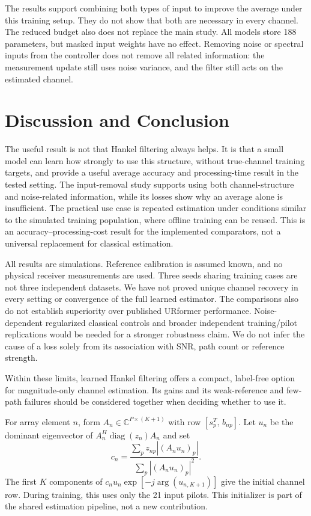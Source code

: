 \documentclass[journal]{IEEEtran}
\begin{document}
The results support combining both types of input to improve the average
under this training setup. They do not show that both are necessary in
every channel. The reduced budget also does not replace the main study.
All models store 188 parameters, but masked input weights have no effect.
Removing noise or spectral inputs from the controller does not remove
all related information: the measurement update still uses noise variance,
and the filter still acts on the estimated channel.

\section{Discussion and Conclusion}
The useful result is not that Hankel filtering always helps. It is that
a small model can learn how strongly to use this structure, without
true-channel training targets, and provide a useful average accuracy and
processing-time result in the tested setting. The input-removal study
supports using both channel-structure and noise-related information,
while its losses show why an average alone is insufficient.
The practical use case is repeated estimation under conditions similar
to the simulated training population, where offline training can be
reused. This is an accuracy--processing-cost result for the implemented
comparators, not a universal replacement for classical estimation.

All results are simulations. Reference calibration is assumed known,
and no physical receiver measurements are used. Three seeds sharing
training cases are not three independent datasets. We have not proved
unique channel recovery in every setting or convergence of the full
learned estimator. The comparisons also do not establish superiority
over published URformer performance.
Noise-dependent regularized classical controls and broader independent
training/pilot replications would be needed for a stronger robustness
claim. We do not infer the cause of a loss solely from its association
with SNR, path count or reference strength.

Within these limits, learned Hankel filtering offers a compact,
label-free option for magnitude-only channel estimation. Its gains and
its weak-reference and few-path failures should be considered together
when deciding whether to use it.

For array element $n$, form $A_n\in\mathbb C^{P\times(K+1)}$ with row
$[s_p^T,\,b_{np}]$. Let $u_n$ be the dominant eigenvector of
$A_n^H\operatorname{diag}(z_n)A_n$ and set
\begin{equation}
 c_n=\frac{\sum_p z_{np}|(A_nu_n)_p|}
 {\sum_p |(A_nu_n)_p|^2}.
\end{equation}
The first $K$ components of
$c_nu_n\exp[-j\arg(u_{n,K+1})]$ give the initial channel row. During
training, this uses only the 21 input pilots. This initializer is part
of the shared estimation pipeline, not a new contribution.
\end{document}
